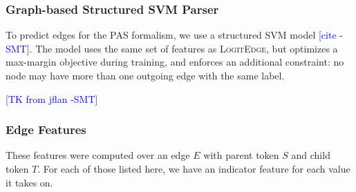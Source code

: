 \documentclass[11pt]{article}
\newcommand{\sam}[1]{\textcolor{blue}{[#1 -SMT]}}
\newcommand{\logitedge}{\textsc{LogitEdge}}
\begin{document}
\subsubsection{Graph-based Structured SVM Parser} \label{s:graphparser}

To predict edges for the PAS formalism, we use a structured SVM model
\sam{cite}.
The model uses the same set of features as \logitedge, but optimizes a
max-margin objective during training, and enforces an additional constraint: no
node may have more than one outgoing edge with the same label.

\sam{TK from jflan}


\subsubsection{Edge Features}

\label{s:features}
These features were computed over an edge $E$ with parent token $S$ and child
token $T$.  For each of those listed here, we have an indicator feature for each value it takes on.
\end{document}
